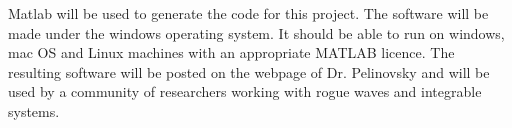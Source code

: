 \documentclass{article}
\begin{document}
Matlab will be used to generate the code for this project. The software will be
made under the windows operating system. It should be able to run on windows,
mac OS and Linux machines with an appropriate MATLAB licence. The resulting
software will be posted on the webpage of Dr. Pelinovsky and will be used by a
community of researchers working with rogue waves and integrable systems. 


\end{document}

